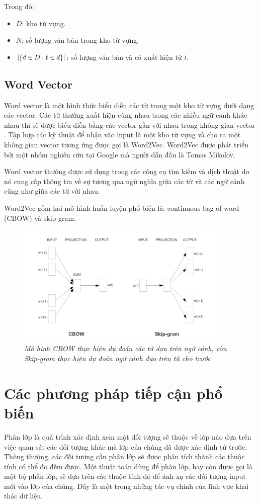 Trong đó:
\begin{itemize}
  \item $D$: kho từ vựng.
  \item $N$: số lượng văn bản trong kho từ vựng.
  \item $\abs{\{d \in D: t \in d \}}$: số lượng văn bản và có xuất hiện từ $t$. 
\end{itemize}
	\subsection*{Word Vector}
Word vector là một hình thức biểu diễn các từ trong một kho từ vựng dưới dạng các vector. Các từ thường xuất hiện cùng nhau trong các nhiều ngữ cảnh khác nhau thì sẽ được biểu diễn bằng các vector gần với nhau trong không gian vector \cite{mikolov:word2vec}. Tập hợp các kỹ thuật để nhận vào input là một kho từ vựng và cho ra một không gian vector tương ứng được gọi là Word2Vec. Word2Vec được phát triển bởi một nhóm nghiên cứu tại Google mà người dẫn đầu là Tomas Mikolov.

  Word vector thường được sử dụng trong các công cụ tìm kiếm và dịch thuật do nó cung cấp thông tin về sự tương qua ngữ nghĩa giữa các từ và các ngữ cảnh cũng như giữa các từ với nhau.

  Word2Vec gồm hai mô hình huấn luyện phổ biến là: continuous bag-of-word (CBOW) và skip-gram. 
	\begin{figure}[H]
    \centering
			\includegraphics[width=0.9\textwidth]{word2vec.png}
      \caption{\textit{Mô hình CBOW thực hiện dự đoán các từ dựa trên ngữ cảnh, còn Skip-gram thực hiện dự đoán ngữ cảnh dựa trên từ cho trước}\cite{mikolov:word2vec}}
	\end{figure}
\section{Các phương pháp tiếp cận phổ biến}
\label{sec:alg}
Phân lớp là quá trình xác định xem một đối tượng sẽ thuộc về lớp nào dựa trên việc quan sát các đối tượng khác mà lớp của chúng đã được xác định từ trước. Thông thường, các đối tượng cần phân lớp sẽ được phân tích thành các thuộc tính có thể đo đếm được. Một thuật toán dùng để phân lớp, hay còn được gọi là một bộ phân lớp, sẽ dựa trên các thuộc tính đó để ánh xạ các đối tượng input mới vào lớp của chúng. Đây là một trong những tác vụ chính của lĩnh vực khai thác dữ liệu.

